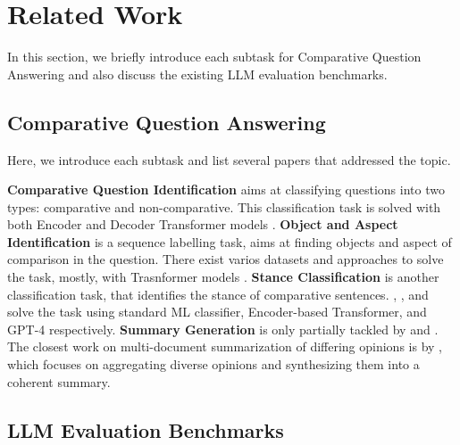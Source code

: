 \section{Related Work}
In this section, we briefly introduce each subtask for Comparative Question Answering and also discuss the existing LLM evaluation benchmarks.


\subsection{Comparative Question Answering}

Here, we introduce each subtask and list several papers that addressed the topic.

\textbf{Comparative Question Identification} aims at classifying questions into two types: comparative and non-comparative. This classification task is solved with both Encoder and Decoder Transformer models \cite{bondarenko2020comparative,DBLP:conf/wsdm/BondarenkoADHBH22,shallouf-etal-2024-cam}.
\textbf{Object and Aspect Identification} is a sequence labelling task, aims at finding objects and aspect of comparison in the question. There exist varios datasets and approaches to solve the task, mostly, with Trasnformer models \cite{chekalina-etal-2021-better,beloucif-etal-2022-elvis,DBLP:conf/wsdm/BondarenkoADHBH22,shallouf-etal-2024-cam}.
\textbf{Stance Classification} is another classification task, that identifies the stance of comparative sentences.  \citet{panchenko-etal-2019-categorizing}, \citet{DBLP:conf/wsdm/BondarenkoADHBH22}, and \citet{DBLP:journals/corr/abs-2310-08523} solve the task using standard ML classifier, Encoder-based Transformer, and GPT-4 respectively.
\textbf{Summary Generation} is only partially tackled by \citet{chekalina-etal-2021-better} and \citet{shallouf-etal-2024-cam}. The closest work on multi-document summarization of differing opinions is by \citet{iso-etal-2022-comparative}, which focuses on aggregating diverse opinions and synthesizing them into a coherent summary.

\subsection{LLM Evaluation Benchmarks}
 
